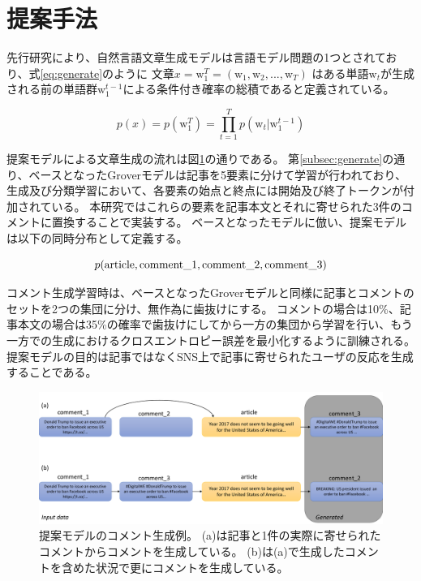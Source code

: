 \section{提案手法}

先行研究により、自然言語文章生成モデルは言語モデル問題の1つとされており、式\ref{eq:generate}のように
文章$x = \mathrm{w}_1^T = (\mathrm{w}_1, \mathrm{w}_2, ..., \mathrm{w}_T)$
はある単語$\mathrm{w}_t$が生成される前の単語群$ \mathrm{w}_1^{t-1}$による条件付き確率の総積であると定義されている。

\begin{equation}
    \label{eq:generate}
    p(x) = p(\mathrm{w}_1^T) = \prod_{t=1}^{T} p(\mathrm{w}_t|\mathrm{w}_1^{t-1})
\end{equation}

提案モデルによる文章生成の流れは図\ref{fig:method}の通りである。
第\ref{subsec:generate}の通り、ベースとなったGroverモデルは記事を5要素に分けて学習が行われており、
生成及び分類学習において、各要素の始点と終点には開始及び終了トークンが付加されている。
本研究ではこれらの要素を記事本文とそれに寄せられた3件のコメントに置換することで実装する。
ベースとなったモデルに倣い、提案モデルは以下の同時分布として定義する。

\begin{equation}
    \label{eq:joint_distri}
    p(\rm{article}, \rm{comment\_1}, \rm{comment\_2}, \rm{comment\_3})
\end{equation}

コメント生成学習時は、ベースとなったGroverモデルと同様に記事とコメントのセットを2つの集団に分け、無作為に歯抜けにする。
コメントの場合は10\%、記事本文の場合は35\%の確率で歯抜けにしてから一方の集団から学習を行い、もう一方での生成におけるクロスエントロピー誤差を最小化するように訓練される\cite{NIPS2019_9106}。
提案モデルの目的は記事ではなくSNS上で記事に寄せられたユーザの反応を生成することである。

\begin{figure}[t]
    \centering
    \includegraphics[width=\linewidth,pagebox=cropbox,clip]{images/fig_method.pdf}
    \caption{
        提案モデルのコメント生成例。
        (a)は記事と1件の実際に寄せられたコメントからコメントを生成している。
        (b)は(a)で生成したコメントを含めた状況で更にコメントを生成している。
    }
    \label{fig:method}
\end{figure}

